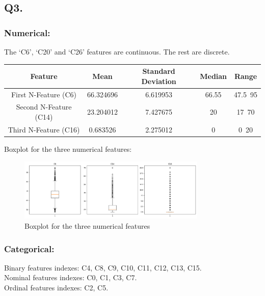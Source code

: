 \documentclass{article}
\begin{document}
\subsection*{Q3.}
\subsubsection*{Numerical:}
The `C6', `C20' and `C26' features are continuous. The rest are discrete. 
\begin{center}
    \begin{tabular}{|c|c|c|c|c|}
        \hline
        Feature & Mean & Standard Deviation & Median & Range\\
        \hline
        First N-Feature (C6)  & 66.324696  & 6.619953 & 66.55& 47.5~95 \\
        Second N-Feature (C14)  & 23.204012 & 7.427675 & 20 & 17~70 \\
        Third N-Feature (C16)  & 0.683526 & 2.275012 & 0 & 0~20 \\
        \hline
    \end{tabular}
\end{center}

Boxplot for the three numerical features:
\begin{figure}[h]
    \centering
    \includegraphics[width=0.8\textwidth]{./pic/boxplot.png}
    \caption{Boxplot for the three numerical features}
\end{figure}

\subsubsection*{Categorical:}
Binary features indexes: C4, C8, C9, C10, C11, C12, C13, C15.\\
Nominal features indexes: C0, C1, C3, C7.\\ 
Ordinal features indexes: C2, C5.\\
\end{document}
